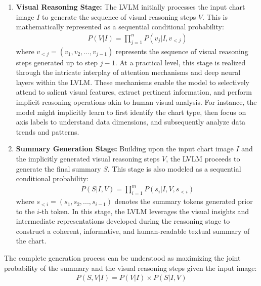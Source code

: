 \begin{enumerate}
    \item \textbf{Visual Reasoning Stage:}  The LVLM initially processes the input chart image $I$ to generate the sequence of visual reasoning steps $V$.  This is mathematically represented as a sequential conditional probability:
    \begin{align}
        P(V|I) = \prod_{j=1}^{n} P(v_j | I, v_{<j})
    \end{align}
    where $v_{<j} = (v_1, v_2, ..., v_{j-1})$ represents the sequence of visual reasoning steps generated up to step $j-1$.  At a practical level, this stage is realized through the intricate interplay of attention mechanisms and deep neural layers within the LVLM. These mechanisms enable the model to selectively attend to salient visual features, extract pertinent information, and perform implicit reasoning operations akin to human visual analysis.  For instance, the model might implicitly learn to first identify the chart type, then focus on axis labels to understand data dimensions, and subsequently analyze data trends and patterns.

    \item \textbf{Summary Generation Stage:}  Building upon the input chart image $I$ and the implicitly generated visual reasoning steps $V$, the LVLM proceeds to generate the final summary $S$.  This stage is also modeled as a sequential conditional probability:
    \begin{align}
        P(S|I, V) = \prod_{i=1}^{m} P(s_i | I, V, s_{<i})
    \end{align}
    where $s_{<i} = (s_1, s_2, ..., s_{i-1})$ denotes the summary tokens generated prior to the $i$-th token.  In this stage, the LVLM leverages the visual insights and intermediate representations developed during the reasoning stage to construct a coherent, informative, and human-readable textual summary of the chart.

\end{enumerate}

The complete generation process can be understood as maximizing the joint probability of the summary and the visual reasoning steps given the input image:
\begin{align}
    P(S, V|I) = P(V|I) \times P(S|I, V)
\end{align}

